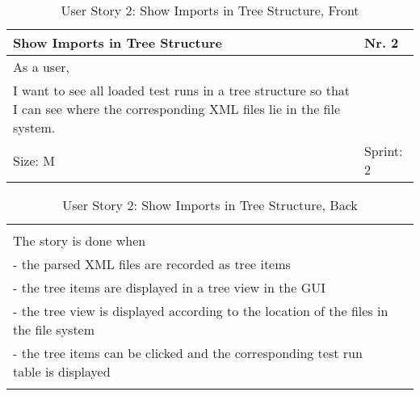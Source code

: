 \begin{table}[H]
  \caption{User Story 2: Show Imports in Tree Structure, Front}
  \label{Story_2_Front}
  \centering
  \begin{tabular}{|p{9cm} p{2cm}|}
	\hline  	
  	Show Imports in Tree Structure & Nr. 2 \\ 
  	\hline
  	As a user, &    \\ 
  	I want to see all loaded test runs in a tree structure so that I can see where the corresponding XML files lie in the file system. &    \\ 
  	Size: M & Sprint: 2 \\ 
  	\hline
  \end{tabular}
\end{table}
\begin{table}[H]
  \caption{User Story 2: Show Imports in Tree Structure, Back}
  \label{Story_2_Back}
  \centering
  \begin{tabular}{|p{10cm} p{1cm}|}
  \hline
  	  &    \\ 
  	The story is done when &    \\ 
  	 - the parsed XML files are recorded as tree items & \\ 
  	 - the tree items are displayed in a tree view in the GUI & \\ 
  	 - the tree view is displayed according to the location of the files in the file system & \\ 
  	 - the tree items can be clicked and the corresponding test run table is displayed & \\ 
  	 
  	  &  
  	   \\ 
  	\hline
  \end{tabular}
\end{table}

\ \\ 

